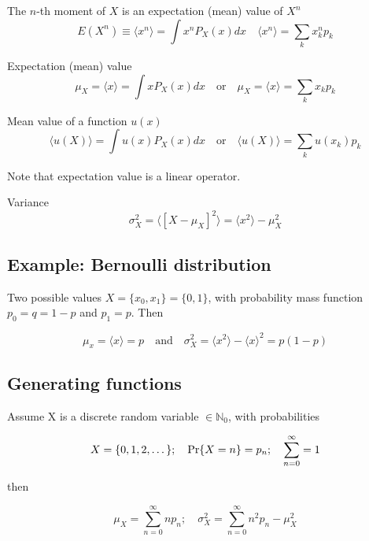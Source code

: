 The $n$-th moment of $X$ is an expectation (mean) value of $X^n$
\begin{equation*}
    E(X^n) \equiv \langle x^n \rangle = \int x^n P_X(x) dx \quad \langle x^n \rangle = \sum_k x^n_k p_k
\end{equation*}

Expectation (mean) value
\begin{equation*}
    \mu_X = \langle x \rangle = \int x P_X(x) dx \quad \text{or} \quad \mu_X = \langle x \rangle = \sum_k x_k p_k
\end{equation*}


Mean value of a function $u(x)$
\begin{equation*}
    \langle u(X) \rangle = \int u(x) P_X(x) dx \quad \text{or} \quad \langle u(X) \rangle = \sum_k u(x_k) p_k
\end{equation*}

Note that expectation value is a linear operator.

Variance
\begin{equation*}
    \sigma_X^2 = \langle [ X - \mu_X ]^2 \rangle = \langle x^2 \rangle - \mu_X^2
\end{equation*}

\subsection*{Example: Bernoulli distribution}
Two possible values $X = \{x_0, x_1\} = \{ 0, 1\}$, with probability mass function $p_0 = q = 1 - p$ and $p_1 = p$. Then

\begin{equation*}
    \mu_x = \langle x \rangle = p \quad \text{and} \quad \sigma^2_X = \langle x^2 \rangle - \langle x \rangle^2 = p (1 - p)
\end{equation*}

\subsection{Generating functions}
Assume X is a discrete random variable $\in \mathbb{N}_0$, with probabilities

\begin{equation*}
    X = \{ 0, 1, 2, \dots \}; \quad {\rm Pr} \{ X = n\} = p_n; \quad \sum_{n=0}^{\infty} = 1
\end{equation*}

then

\begin{equation*}
    \mu_X = \sum_{n = 0}^{\infty} n p_n; \quad \sigma^2_X = \sum_{n = 0}^{\infty} n^2 p_n - \mu_X^2
\end{equation*}

